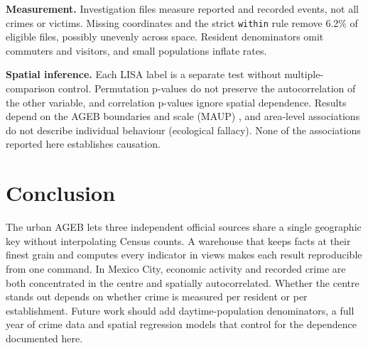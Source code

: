 \documentclass[peerreviewca]{IEEEtran}
\begin{document}
\textbf{Measurement.} Investigation files measure reported and recorded events, not all crimes or victims. Missing coordinates and the strict \texttt{within} rule remove 6.2\% of eligible files, possibly unevenly across space. Resident denominators omit commuters and visitors, and small populations inflate rates.

\textbf{Spatial inference.} Each LISA label is a separate test without multiple-comparison control. Permutation p-values do not preserve the autocorrelation of the other variable, and correlation p-values ignore spatial dependence. Results depend on the AGEB boundaries and scale (MAUP) \cite{openshaw1984}, and area-level associations do not describe individual behaviour (ecological fallacy). None of the associations reported here establishes causation.

\section{Conclusion}

The urban AGEB lets three independent official sources share a single geographic key without interpolating Census counts. A warehouse that keeps facts at their finest grain and computes every indicator in views makes each result reproducible from one command. In Mexico City, economic activity and recorded crime are both concentrated in the centre and spatially autocorrelated. Whether the centre stands out depends on whether crime is measured per resident or per establishment. Future work should add daytime-population denominators, a full year of crime data and spatial regression models that control for the dependence documented here.
\end{document}
